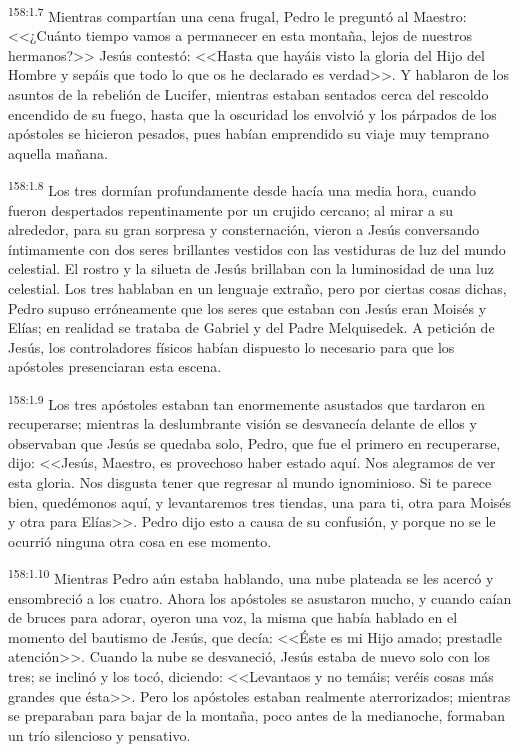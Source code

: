 \par 
\textsuperscript{158:1.7} Mientras compartían una cena frugal, Pedro le preguntó al Maestro: <<¿Cuánto tiempo vamos a permanecer en esta montaña, lejos de nuestros hermanos?>> Jesús contestó: <<Hasta que hayáis visto la gloria del Hijo del Hombre y sepáis que todo lo que os he declarado es verdad>>. Y hablaron de los asuntos de la rebelión de Lucifer, mientras estaban sentados cerca del rescoldo encendido de su fuego, hasta que la oscuridad los envolvió y los párpados de los apóstoles se hicieron pesados, pues habían emprendido su viaje muy temprano aquella mañana.

\par 
\textsuperscript{158:1.8} Los tres dormían profundamente desde hacía una media hora, cuando fueron despertados repentinamente por un crujido cercano; al mirar a su alrededor, para su gran sorpresa y consternación, vieron a Jesús conversando íntimamente con dos seres brillantes vestidos con las vestiduras de luz del mundo celestial. El rostro y la silueta de Jesús brillaban con la luminosidad de una luz celestial. Los tres hablaban en un lenguaje extraño, pero por ciertas cosas dichas, Pedro supuso erróneamente que los seres que estaban con Jesús eran Moisés y Elías; en realidad se trataba de Gabriel y del Padre Melquisedek. A petición de Jesús, los controladores físicos habían dispuesto lo necesario para que los apóstoles presenciaran esta escena.

\par 
\textsuperscript{158:1.9} Los tres apóstoles estaban tan enormemente asustados que tardaron en recuperarse; mientras la deslumbrante visión se desvanecía delante de ellos y observaban que Jesús se quedaba solo, Pedro, que fue el primero en recuperarse, dijo: <<Jesús, Maestro, es provechoso haber estado aquí. Nos alegramos de ver esta gloria. Nos disgusta tener que regresar al mundo ignominioso. Si te parece bien, quedémonos aquí, y levantaremos tres tiendas, una para ti, otra para Moisés y otra para Elías>>. Pedro dijo esto a causa de su confusión, y porque no se le ocurrió ninguna otra cosa en ese momento.

\par 
\textsuperscript{158:1.10} Mientras Pedro aún estaba hablando, una nube plateada se les acercó y ensombreció a los cuatro. Ahora los apóstoles se asustaron mucho, y cuando caían de bruces para adorar, oyeron una voz, la misma que había hablado en el momento del bautismo de Jesús, que decía: <<Éste es mi Hijo amado; prestadle atención>>. Cuando la nube se desvaneció, Jesús estaba de nuevo solo con los tres; se inclinó y los tocó, diciendo: <<Levantaos y no temáis; veréis cosas más grandes que ésta>>. Pero los apóstoles estaban realmente aterrorizados; mientras se preparaban para bajar de la montaña, poco antes de la medianoche, formaban un trío silencioso y pensativo.

